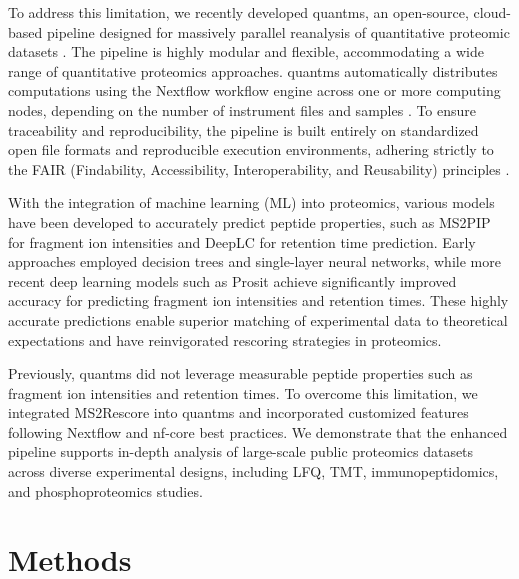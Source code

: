 \documentclass[12pt]{article}
\begin{document}
To address this limitation, we recently developed quantms, an open-source, cloud-based pipeline designed for massively parallel reanalysis of quantitative proteomic datasets \cite{dai_quantms_2024}. The pipeline is highly modular and flexible, accommodating a wide range of quantitative proteomics approaches. quantms automatically distributes computations using the Nextflow workflow engine across one or more computing nodes, depending on the number of instrument files and samples \cite{di_tommaso_nextflow_2017}. To ensure traceability and reproducibility, the pipeline is built entirely on standardized open file formats and reproducible execution environments, adhering strictly to the FAIR (Findability, Accessibility, Interoperability, and Reusability) principles \cite{wilkinson_fair_2016}.

With the integration of machine learning (ML) into proteomics, various models have been developed to accurately predict peptide properties, such as MS2PIP \cite{degroeve_ms2pip_2013} for fragment ion intensities and DeepLC \cite{bouwmeester_deeplc_2021} for retention time prediction. Early approaches employed decision trees and single-layer neural networks, while more recent deep learning models such as Prosit \cite{gessulat_prosit_2019} achieve significantly improved accuracy for predicting fragment ion intensities and retention times. These highly accurate predictions enable superior matching of experimental data to theoretical expectations and have reinvigorated rescoring strategies in proteomics.

Previously, quantms did not leverage measurable peptide properties such as fragment ion intensities and retention times. To overcome this limitation, we integrated MS2Rescore into quantms and incorporated customized features following Nextflow and nf-core best practices. We demonstrate that the enhanced pipeline supports in-depth analysis of large-scale public proteomics datasets across diverse experimental designs, including LFQ, TMT, immunopeptidomics, and phosphoproteomics studies.

\section{Methods}
\end{document}
